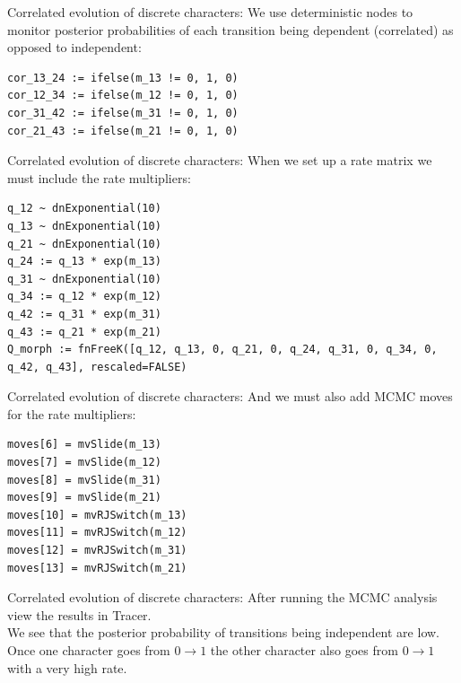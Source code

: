 \documentclass[mathserif]{beamer}
\begin{document}
\begin{frame}[fragile]
    \begin{block}{Correlated evolution of discrete characters:}
    \bigskip
We use deterministic nodes to monitor posterior probabilities of each 
transition being dependent (correlated) as opposed to independent:
    \bigskip
    \begin{lstlisting}
cor_13_24 := ifelse(m_13 != 0, 1, 0)
cor_12_34 := ifelse(m_12 != 0, 1, 0)
cor_31_42 := ifelse(m_31 != 0, 1, 0)
cor_21_43 := ifelse(m_21 != 0, 1, 0)
    \end{lstlisting}
\bigskip
    \end{block}
\end{frame}


\begin{frame}[fragile]
    \begin{block}{Correlated evolution of discrete characters:}
    \bigskip
When we set up a rate matrix we must include the rate multipliers:
    \bigskip
    \begin{lstlisting}
q_12 ~ dnExponential(10)
q_13 ~ dnExponential(10)
q_21 ~ dnExponential(10)
q_24 := q_13 * exp(m_13)
q_31 ~ dnExponential(10)
q_34 := q_12 * exp(m_12)
q_42 := q_31 * exp(m_31)
q_43 := q_21 * exp(m_21)
Q_morph := fnFreeK([q_12, q_13, 0, q_21, 0, q_24, q_31, 0, q_34, 0, q_42, q_43], rescaled=FALSE)
    \end{lstlisting}
\bigskip
    \end{block}
\end{frame}


\begin{frame}[fragile]
    \begin{block}{Correlated evolution of discrete characters:}
    \bigskip
And we must also add MCMC moves for the rate multipliers:
    \bigskip
    \begin{lstlisting}
moves[6] = mvSlide(m_13)
moves[7] = mvSlide(m_12)
moves[8] = mvSlide(m_31)
moves[9] = mvSlide(m_21)
moves[10] = mvRJSwitch(m_13)
moves[11] = mvRJSwitch(m_12)
moves[12] = mvRJSwitch(m_31)
moves[13] = mvRJSwitch(m_21)
    \end{lstlisting}
\bigskip
    \end{block}
\end{frame}


\begin{frame}[fragile]
    \begin{block}{Correlated evolution of discrete characters:}
    \bigskip
    \bigskip
After running the MCMC analysis view the results in Tracer.\\
    \bigskip
We see that the posterior probability of 
transitions being independent are low.\\
    \bigskip
Once one character goes from $0\rightarrow1$
        the other character also goes from $0\rightarrow1$
with a very high rate.
\bigskip
    \end{block}
\end{frame}
\end{document}
